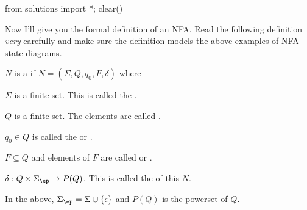 \begin{python0}
  from solutions import *; clear()
\end{python0}

Now I'll give you the formal definition of an NFA.
Read the following
definition \textit{very} carefully and make sure the definition models
the above examples of NFA state diagrams.

\begin{defn}
  $N$ is a
  if $N =
  (\Sigma,Q,q_0,F,\delta)$ where
  \begin{tightlist}
  \item $\Sigma$ is a finite set. This is called the
    .
  \item $Q$ is a finite set. The elements are called
    .
  \item $q_0 \in Q$ is called the
    or
    \tinysidebarskip{}\sidebarskip{0pt}.
  \item $F \subseteq Q$ and elements of $F$ are called
    or
    \tinysidebarskip{}\sidebarskip{0pt}.
  \item $\delta : Q \times \Sigma_\ep \rightarrow P(Q)$.
    This is called the 
    of this $N$.
  \end{tightlist}
  In the above, $\Sigma_\ep = \Sigma \cup \{\epsilon\}$
  and $P(Q)$ is the powerset of $Q$.
\end{defn}









